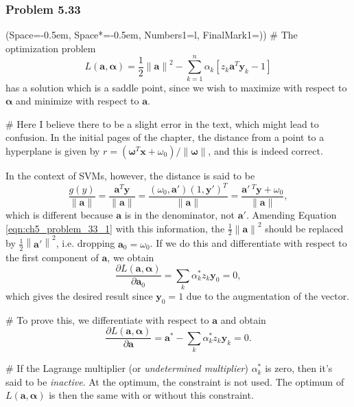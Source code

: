 \documentclass[12pt, a4paper]{article}
\newcommand{\listSpace}{-0.5em}%
\newcommand{\vect}[1]{\bm{#1}}
\newcommand{\norm}[1]{\left\lVert#1\right\rVert}
\begin{document}
{\subsubsection*{Problem 5.33}
\begin{easylist}[enumerate]
\ListProperties(Space=\listSpace, Space*=\listSpace, Numbers1=l, FinalMark1={)})
# The optimization problem
\begin{equation}
\label{eqn:ch5_problem_33_1}
	L(\vect{a}, \vect{\alpha}) = \frac{1}{2} \norm{\vect{a}}^2 -
	\sum_{k=1}^{n} \alpha_k \left[ z_k \vect{a}^T \vect{y}_k - 1 \right]
\end{equation}
has a solution which is a saddle point, since we wish to maximize with respect to $\vect{\alpha}$ and minimize with respect to $\vect{a}$.

# Here I believe there to be a slight error in the text, which might lead to confusion.
In the initial pages of the chapter, the distance from a point to a hyperplane is given by $r = (\vect{\omega}^T \vect{x} + \omega_0) / \norm{\vect{\omega}}$, and this is indeed correct.

In the context of SVMs, however, the distance is said to be 
\begin{equation*}
	\frac{g(y)}{\norm{\vect{a}}}
	=
	\frac{\vect{a} ^T \vect{y}}{\norm{\vect{a}}}
	=
	\frac{(\omega_0, \vect{a}') (1, \vect{y}')^T}{\norm{\vect{a}}}
	=
	\frac{\vect{a}'\,^T\vect{y} + \omega_0}{\norm{\vect{a}}},
\end{equation*}
which is different because $\vect{a}$ is in the denominator, not $\vect{a}'$.
Amending Equation \eqref{eqn:ch5_problem_33_1} with this information, the $\frac{1}{2} \norm{\vect{a}}^2$ should be replaced by $\frac{1}{2} \norm{\vect{a}'}^2$, i.e. dropping $\vect{a}_0 = \omega_0$.
If we do this and differentiate with respect to the first component of $\vect{a}$, we obtain
\begin{equation*}
	\frac{\partial L(\vect{a}, \vect{\alpha})}{\partial \vect{a}_0}
	=
	\sum_k \alpha_k^* z_k \vect{y}_0 = 0,
\end{equation*}
which gives the desired result since $\vect{y}_0 = 1$ due to the augmentation of the vector.

# To prove this, we differentiate with respect to $\vect{a}$ and obtain
\begin{equation*}
\frac{\partial L(\vect{a}, \vect{\alpha})}{\partial \vect{a}}
=
\vect{a}^* - \sum_k \alpha_k^* z_k \vect{y}_k = 0.
\end{equation*}

# If the Lagrange multiplier (or \emph{undetermined multiplier}) $\alpha_k^*$ is zero, then it's said to be \emph{inactive}.
At the optimum, the constraint is not used.
The optimum of $L(\vect{a}, \vect{\alpha})$ is then the same with or without this constraint.


\end{easylist}}
\end{document}

